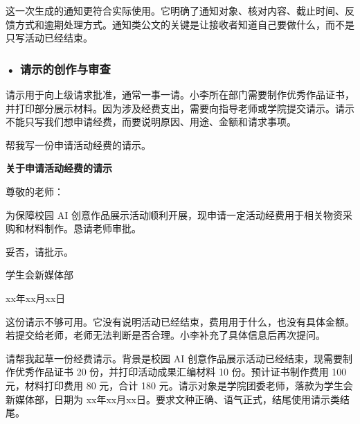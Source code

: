 这一次生成的通知更符合实际使用。它明确了通知对象、核对内容、截止时间、反馈方式和逾期处理方式。通知类公文的关键是让接收者知道自己要做什么，而不是只写活动已经结束。

\subsubsection*{\textbf{• 请示的创作与审查}}

请示用于向上级请求批准，通常一事一请。小李所在部门需要制作优秀作品证书，并打印部分展示材料。因为涉及经费支出，需要向指导老师或学院提交请示。请示不能只写我们想申请经费，而要说明原因、用途、金额和请求事项。

\begin{userbox}
帮我写一份申请活动经费的请示。
\end{userbox}

\begin{aibox}

\begin{center}
\textbf{关于申请活动经费的请示}
\end{center}
\noindent 尊敬的老师：

\par\qquad 为保障校园 AI 创意作品展示活动顺利开展，现申请一定活动经费用于相关物资采购和材料制作。恳请老师审批。

\par\qquad 妥否，请批示。

\par\hfill 学生会新媒体部

\par\hfill xx年xx月xx日
\end{aibox}

这份请示不够可用。它没有说明活动已经结束，费用用于什么，也没有具体金额。若提交给老师，老师无法判断是否合理。小李补充了具体信息后再次提问。

\begin{userbox}
请帮我起草一份经费请示。背景是校园 AI 创意作品展示活动已经结束，现需要制作优秀作品证书 20 份，并打印活动成果汇编材料 10 份。预计证书制作费用 100 元，材料打印费用 80 元，合计 180 元。请示对象是学院团委老师，落款为学生会新媒体部，日期为 xx年xx月xx日。要求文种正确、语气正式，结尾使用请示类结尾。
\end{userbox}

